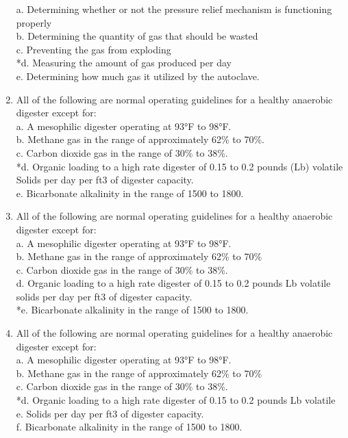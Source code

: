 \documentclass{article}
\begin{document}
\begin{enumerate}
a. Determining whether or not the pressure relief mechanism is functioning properly \\
b. Determining the quantity of gas that should be wasted \\
c. Preventing the gas from exploding \\
*d. Measuring the amount of gas produced per day \\
e. Determining how much gas it utilized by the autoclave. \\

\item  All of the following are normal operating guidelines for a healthy anaerobic digester except for: \\

a. A mesophilic digester operating at 93°F to 98°F. \\
b. Methane gas in the range of approximately 62\% to 70\%. \\
c. Carbon dioxide gas in the range of 30\% to 38\%. \\
*d. Organic loading to a high rate digester of 0.15 to 0.2 pounds (Lb) volatile Solids per day per ft3 of digester capacity. \\
e. Bicarbonate alkalinity in the range of 1500 to 1800. \\

\item  All of the following are normal operating guidelines for a healthy anaerobic digester except for: \\

a. A mesophilic digester operating at 93°F to 98°F. \\
b. Methane gas in the range of approximately 62\% to 70\% \\
c. Carbon dioxide gas in the range of 30\% to 38\%. \\
d. Organic loading to a high rate digester of 0.15 to 0.2 pounds Lb volatile solids per day per ft3 of digester capacity. \\
*e. Bicarbonate alkalinity in the range of 1500 to 1800. \\

\item  All of the following are normal operating guidelines for a healthy anaerobic digester except for: \\

a. A mesophilic digester operating at 93°F to 98°F. \\
b. Methane gas in the range of approximately 62\% to 70\% \\
c. Carbon dioxide gas in the range of 30\% to 38\%. \\
*d. Organic loading to a high rate digester of 0.15 to 0.2 pounds Lb volatile \\
e. Solids per day per ft3 of digester capacity. \\
f. Bicarbonate alkalinity in the range of 1500 to 1800. \\


\end{enumerate}
\end{document}
